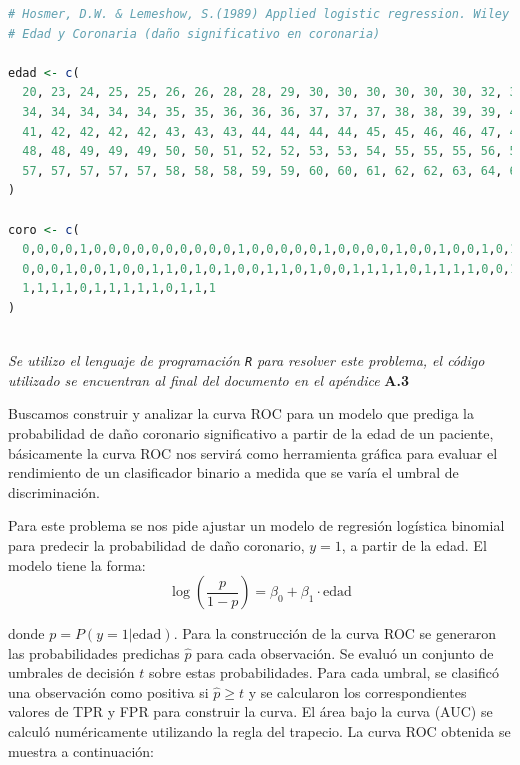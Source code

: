 \begin{lstlisting}[language=R, caption={Datos de Edad y Daño Coronario}]
# Hosmer, D.W. & Lemeshow, S.(1989) Applied logistic regression. Wiley
# Edad y Coronaria (daño significativo en coronaria)

edad <- c(
  20, 23, 24, 25, 25, 26, 26, 28, 28, 29, 30, 30, 30, 30, 30, 30, 32, 32, 33, 33,
  34, 34, 34, 34, 34, 35, 35, 36, 36, 36, 37, 37, 37, 38, 38, 39, 39, 40, 40, 41,
  41, 42, 42, 42, 42, 43, 43, 43, 44, 44, 44, 44, 45, 45, 46, 46, 47, 47, 47, 48,
  48, 48, 49, 49, 49, 50, 50, 51, 52, 52, 53, 53, 54, 55, 55, 55, 56, 56, 56, 57,
  57, 57, 57, 57, 57, 58, 58, 58, 59, 59, 60, 60, 61, 62, 62, 63, 64, 64, 65, 69
)

coro <- c(
  0,0,0,0,1,0,0,0,0,0,0,0,0,0,0,1,0,0,0,0,0,1,0,0,0,0,1,0,0,1,0,0,1,0,1,0,1,0,1,0,
  0,0,0,1,0,0,1,0,0,1,1,0,1,0,1,0,0,1,1,0,1,0,0,1,1,1,1,0,1,1,1,1,0,0,1,1,1,1,0,
  1,1,1,1,0,1,1,1,1,1,0,1,1,1
)
\end{lstlisting}

\newpage
\noindent{}\\

\textit{Se utilizo el lenguaje de programación \texttt{R} para resolver este problema, el código utilizado se encuentran al final del documento en el apéndice} \textbf{A.3}

Buscamos construir y analizar la curva ROC para un modelo que prediga la probabilidad de daño coronario significativo a partir de la edad de un paciente, básicamente la curva ROC nos servirá como herramienta gráfica para evaluar el rendimiento de un clasificador binario a medida que se varía el umbral de discriminación. 

Para este problema se nos pide ajustar un modelo de regresión logística binomial para predecir la probabilidad de daño coronario, $y=1$, a partir de la edad. El modelo tiene la forma:
\begin{equation}
    \log\left(\frac{p}{1-p}\right) = \beta_0 + \beta_1 \cdot \text{edad}
\end{equation}

donde $p = P(y=1 | \text{edad})$. Para la construcción de la curva ROC se generaron las probabilidades predichas $\hat{p}$ para cada observación. Se evaluó un conjunto de umbrales de decisión $t$ sobre estas probabilidades. Para cada umbral, se clasificó una observación como positiva si $\hat{p} \ge t$ y se calcularon los correspondientes valores de TPR y FPR para construir la curva. El área bajo la curva (AUC) se calculó numéricamente utilizando la regla del trapecio. La curva ROC obtenida se muestra a continuación:

